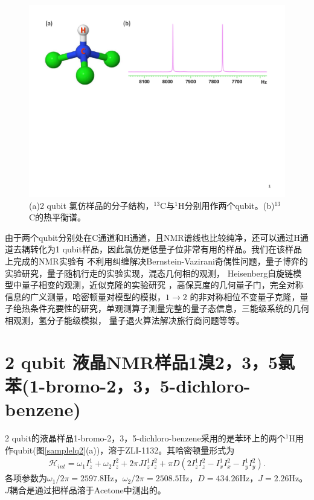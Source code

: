 \begin{figure}[htbp]
            \begin{center}
              \includegraphics[width= 0.8\columnwidth]{figures/samplechlorofom.pdf}
              \caption{(a)2 qubit 氯仿样品的分子结构，$^{13}$C与$^{1}$H分别用作两个qubit。(b)$^{13}$C的热平衡谱。}
              \label{samplechlorofom}
            \end{center}
\end{figure}

由于两个qubit分别处在C通道和H通道，且NMR谱线也比较纯净，还可以通过H通道去耦转化为1 qubit样品，因此氯仿是低量子位非常有用的样品。我们在该样品上完成的NMR实验有
不利用纠缠解决Bernstein-Vazirani奇偶性问题\cite{app1}，量子博弈的实验研究\cite{app2}，量子随机行走的实验实现\cite{app3}，混态几何相的观测\cite{app4}，
Heisenberg自旋链模型中量子相变的观测\cite{app5}，近似克隆的实验研究\cite{app6} ，高保真度的几何量子门\cite{app7}，完全对称信息的广义测量\cite{app8}，哈密顿量对模型的模拟\cite{nmrsim6}，$1\rightarrow2$ 的非对称相位不变量子克隆\cite{app9}，量子绝热条件充要性的研究\cite{app10}，单观测算子测量完整的量子态信息\cite{app11}，三能级系统的几何相观测\cite{app12}，氢分子能级模拟\cite{static}， 量子退火算法解决旅行商问题\cite{app13}等等。

\section{2 qubit 液晶NMR样品1溴2，3，5氯苯(1-bromo-2，3，5-dichloro-benzene)}

2 qubit的液晶样品1-bromo-2，3，5-dichloro-benzene采用的是苯环上的两个$^{1}$H用作qubit(图\ref{samplelq2}(a))，溶于ZLI-1132。其哈密顿量形式为
\begin{eqnarray}
\mathcal{H}_{int}=\omega_1I_z^1+\omega_2I_z^2+2\pi J I_z^1I_z^2+\pi D(2I_z^1I_z^2-I_x^1I_x^2-I_y^1I_y^2).
\end{eqnarray}
各项参数为$\omega_1/2\pi = 2597.8$Hz，$\omega_2/2\pi = 2508.5$Hz，$D= 434.26$Hz，$J = 2.26$Hz。$J$耦合是通过把样品溶于Acetone中测出的。

